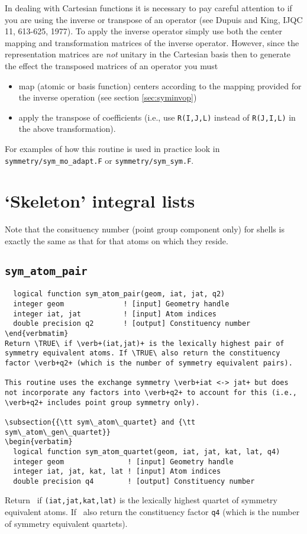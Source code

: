 In dealing with Cartesian functions it is necessary to pay careful
attention to if you are using the inverse or transpose of an operator
(see Dupuis and King, IJQC 11, 613-625, 1977).  To apply the inverse
operator simply use both the center mapping and transformation
matrices of the inverse operator.  However, since the representation
matrices are {\em not} unitary in the Cartesian basis then to generate
the effect the transposed matrices of an operator you must
\begin{itemize}
\item map (atomic or basis function) centers according to the mapping
  provided for the inverse operation (see section \ref{sec:syminvop})
\item apply the transpose of coefficients (i.e., use \verb+R(I,J,L)+
  instead of \verb+R(J,I,L)+ in the above transformation).
\end{itemize}

For examples of how this routine is used in practice look in
\verb+symmetry/sym_mo_adapt.F+ or \verb+symmetry/sym_sym.F+.

\section{`Skeleton' integral lists}

Note that the consituency number (point group component only) for
shells is exactly the same as that for that atoms on which they reside.

\subsection{{\tt sym\_atom\_pair}}
\begin{verbatim}
  logical function sym_atom_pair(geom, iat, jat, q2)
  integer geom              ! [input] Geometry handle
  integer iat, jat          ! [input] Atom indices
  double precision q2       ! [output] Constituency number
\end{verbmatim}
Return \TRUE\ if \verb+(iat,jat)+ is the lexically highest pair of
symmetry equivalent atoms. If \TRUE\ also return the constituency
factor \verb+q2+ (which is the number of symmetry equivalent pairs).

This routine uses the exchange symmetry \verb+iat <-> jat+ but does
not incorporate any factors into \verb+q2+ to account for this (i.e.,
\verb+q2+ includes point group symmetry only).

\subsection{{\tt sym\_atom\_quartet} and {\tt sym\_atom\_gen\_quartet}}
\begin{verbatim}
  logical function sym_atom_quartet(geom, iat, jat, kat, lat, q4)
  integer geom               ! [input] Geometry handle
  integer iat, jat, kat, lat ! [input] Atom indices
  double precision q4        ! [output] Constituency number
\end{verbatim}
Return \TRUE\ if \verb+(iat,jat,kat,lat)+ is the lexically highest
quartet of symmetry equivalent atoms. If \TRUE\ also return the
constituency factor \verb+q4+ (which is the number of symmetry
equivalent quartets).

